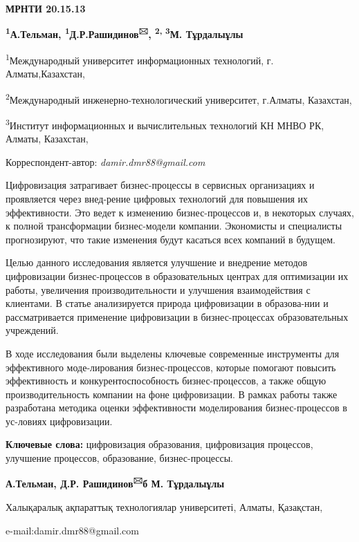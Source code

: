 
\newpage
{\bfseries МРНТИ 20.15.13}


\begin{center}


{\bfseries \textsuperscript{1}А.Тельман, \textsuperscript{1}Д.Р.Рашидинов\textsuperscript{🖂}, \textsuperscript{2, 3}М. Тұрдалыұлы}

\textsuperscript{1}Международный университет информационных технологий, г. Алматы,Казахстан,

\textsuperscript{2}Международный инженерно-технологический университет, г.Алматы, Казахстан,

\textsuperscript{3}Институт информационных и вычислительных технологий КН МНВО РК, Алматы, Казахстан,
\end{center}
Корреспондент-автор: \emph{damir.dmr88@gmail.com}\vspace{0.5cm}

Цифровизация затрагивает бизнес-процессы в сервисных организациях и
проявляется через внед-рение цифровых технологий для повышения их
эффективности. Это ведет к изменению бизнес-процессов и, в некоторых
случаях, к полной трансформации бизнес-модели компании. Экономисты и
специалисты прогнозируют, что такие изменения будут касаться всех
компаний в будущем.

Целью данного исследования является улучшение и внедрение методов
цифровизации бизнес-процессов в образовательных центрах для оптимизации
их работы, увеличения производительности и улучшения взаимодействия с
клиентами. В статье анализируется природа цифровизации в образова-нии и
рассматривается применение цифровизации в бизнес-процессах
образовательных учреждений.

В ходе исследования были выделены ключевые современные инструменты для
эффективного моде-лирования бизнес-процессов, которые помогают повысить
эффективность и конкурентоспособность бизнес-процессов, а также общую
производительность компании на фоне цифровизации. В рамках работы также
разработана методика оценки эффективности моделирования бизнес-процессов
в ус-ловиях цифровизации.

{\bfseries Ключевые слова:} цифровизация образования, цифровизация
процессов, улучшение процессов, образование, бизнес-процессы.

\begin{center}

{\bfseries А.Тельман, Д.Р. Рашидинов\textsuperscript{🖂}б М. Тұрдалыұлы}

Халықаралық ақпараттық технологиялар университеті, Алматы, Қазақстан,

e-mail:damir.dmr88@gmail.com
\end{center}

